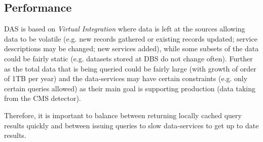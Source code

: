 \documentclass[a4paper,11pt,draft]{article}
\begin{document}
       

\subsection{Performance}

DAS is based on \textit{Virtual Integration} where data is left at the sources allowing data to be volatile (e.g. new records gathered or existing records updated; service descriptions may be changed; new services added), while some subsets of the data could be fairly static (e.g. datasets stored at DBS do not change often). 
Further as the total data that is being queried could be fairly large (with growth of order of 1TB per year) and the data-services may have certain constraints (e.g. only certain queries allowed) as their main goal is supporting production (data taking from the CMS detector).

Therefore, it is important to balance between returning locally cached query results quickly   and between issuing queries to slow data-services to get up to date results.
\end{document}
